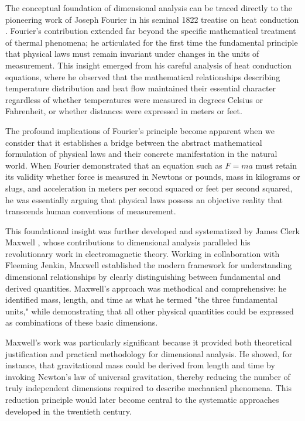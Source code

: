\documentclass[
	11pt, %
	fleqn, %
	a4paper, %
]{LegrandOrangeBook}
\begin{document}
The conceptual foundation of dimensional analysis can be traced directly to the pioneering work of Joseph Fourier in his seminal 1822 treatise on heat conduction \cite{fourier1822}. Fourier's contribution extended far beyond the specific mathematical treatment of thermal phenomena; he articulated for the first time the fundamental principle that physical laws must remain invariant under changes in the units of measurement. This insight emerged from his careful analysis of heat conduction equations, where he observed that the mathematical relationships describing temperature distribution and heat flow maintained their essential character regardless of whether temperatures were measured in degrees Celsius or Fahrenheit, or whether distances were expressed in meters or feet.

The profound implications of Fourier's principle become apparent when we consider that it establishes a bridge between the abstract mathematical formulation of physical laws and their concrete manifestation in the natural world. When Fourier demonstrated that an equation such as $F = ma$ must retain its validity whether force is measured in Newtons or pounds, mass in kilograms or slugs, and acceleration in meters per second squared or feet per second squared, he was essentially arguing that physical laws possess an objective reality that transcends human conventions of measurement.

This foundational insight was further developed and systematized by James Clerk Maxwell \cite{maxwell1873}, whose contributions to dimensional analysis paralleled his revolutionary work in electromagnetic theory. Working in collaboration with Fleeming Jenkin, Maxwell established the modern framework for understanding dimensional relationships by clearly distinguishing between fundamental and derived quantities. Maxwell's approach was methodical and comprehensive: he identified mass, length, and time as what he termed "the three fundamental units," while demonstrating that all other physical quantities could be expressed as combinations of these basic dimensions.

Maxwell's work was particularly significant because it provided both theoretical justification and practical methodology for dimensional analysis. He showed, for instance, that gravitational mass could be derived from length and time by invoking Newton's law of universal gravitation, thereby reducing the number of truly independent dimensions required to describe mechanical phenomena. This reduction principle would later become central to the systematic approaches developed in the twentieth century.
\end{document}
